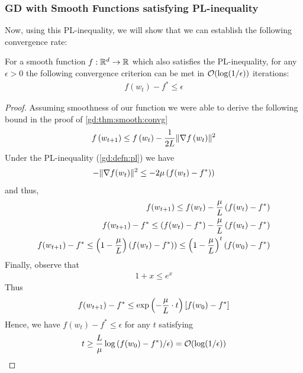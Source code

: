 \subsubsection{GD with Smooth Functions satisfying PL-inequality}
Now, using this PL-inequality, we will show that we can establish the following convergence rate:
\begin{mdframed}
\begin{theorem}
For a smooth function $f: \mathbb{R}^d \to \mathbb{R}$ which also satisfies the PL-inequality, for any $\epsilon > 0$ the following convergence criterion can be met in $\mathcal{O}(\log(1/\epsilon))$ iterations:
\begin{align*}
    f(w_t) - f^* \leq \epsilon
\end{align*}
\end{theorem}
\end{mdframed}

\begin{proof}
 Assuming smoothness of our function we were able to derive the following bound in the proof of \autoref{gd:thm:smooth:convg}
\begin{align*}
f \left( w_{t+1} \right) \leq f \left( w_t \right) - \frac{1}{2L} \lVert \nabla f \left( w_t \right)  \rVert^2
\end{align*}
Under the PL-inequality (\autoref{gd:defn:pl}) we have
\begin{align*}
    -\lVert \nabla f(w_t) \rVert^2 \leq -2\mu \left( f(w_t) - f^*) \right)
\end{align*}
and thus,
\begin{align*}
    f(w_{t+1}) \leq f(w_t) - \frac{\mu}{L} \left( f(w_t) - f^* \right) \\
    f(w_{t+1}) - f^* \leq (f(w_t) - f^*) - \frac{\mu}{L} \left( f(w_t) - f^* \right) \\
    f(w_{t+1}) - f^* \leq \left( 1 - \frac{\mu}{L} \right) \left( f(w_t) - f^*) \right) \leq \left( 1 - \frac{\mu}{L}\right)^t (f(w_0) - f^*)
\end{align*}
Finally, observe that
\begin{align*}
    1 + x \leq e^x
\end{align*}
Thus
\begin{align*}
    f(w_{t+1}) - f^* \leq \exp\left(-\frac{\mu}{L} \cdot t\right) \left[f(w_0) - f^*\right]
\end{align*}
Hence, we have $f(w_t) - f^* \leq \epsilon$ for any $t$ satisfying
\begin{align*}
    t \geq \frac{L}{\mu} \log{(f(w_0) - f^*) / \epsilon)} = \mathcal{O}(\log(1/\epsilon))
\end{align*}
\end{proof}

